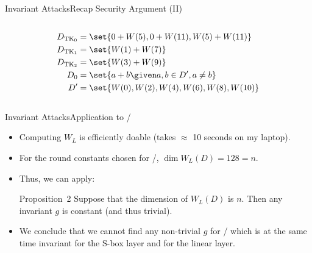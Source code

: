 \begin{frame}{Invariant Attacks}{Recap Security Argument (II)}
{\begin{columns}
\begin{column}{0.45\textwidth}
\begin{align*}
                D_{\mathrm{TK}_0} &= \set{0 + W(5), 0 + W(11), W(5) + W(11)} \\
                D_{\mathrm{TK}_1} &= \set{W(1) + W(7)} \\
                D_{\mathrm{TK}_2} &= \set{W(3) + W(9)} \\
                D_{0} &= \set{a + b \given a, b \in D^\prime, a \neq b} \\
                D^\prime &= \set{W(0), W(2), W(4), W(6), W(8), W(10)}
            \end{align*}
        \end{column}
    \end{columns}
    }
\end{frame}

\begin{frame}{Invariant Attacks}{Application to \clyde/}
    \begin{itemize}
        \item Computing $W_L$ is efficiently doable (takes $\approx$ 10 seconds on my laptop).
        \item For the round constants chosen for \clyde/, $\dim W_L(D) = 128 = n$.
        \item Thus, we can apply:
              \begin{block}{Proposition~2 \cite{C:BCLR17}}
                  Suppose that the dimension of $W_L(D)$ is $n$.
                  Then any invariant $g$ is constant (and thus trivial).
              \end{block}
        \item We conclude that we cannot find any non-trivial $g$ for \clyde/ which is at the same time invariant for the S-box layer and for the linear layer.
    \end{itemize}
\end{frame}

